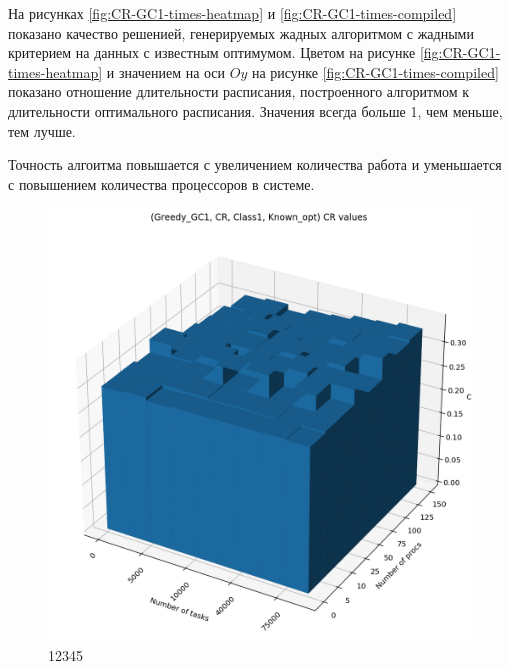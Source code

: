 На рисунках \ref{fig:CR-GC1-times-heatmap} и \ref{fig:CR-GC1-times-compiled} показано качество решенией, генерируемых жадных алгоритмом с жадными критерием на данных с известным оптимумом. Цветом на рисунке \ref{fig:CR-GC1-times-heatmap} и значением на оси $Oy$ на рисунке \ref{fig:CR-GC1-times-compiled} показано отношение длительности расписания, построенного алгоритмом к длительности оптимального расписания. Значения всегда больше 1, чем меньше, тем лучше.

Точность алгоитма повышается с увеличением количества работа и уменьшается с повышением количества процессоров в системе. 

\begin{figure}[!htbp]
    \centering
    \includegraphics[width=\textwidth]{imgs/ideal_1/CR/cr_3d.png}
    \caption{12345}
\end{figure}

